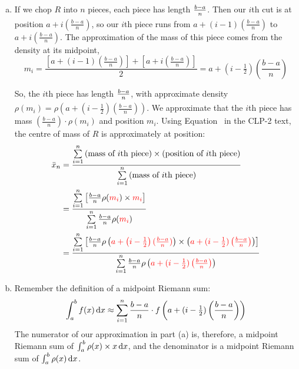 \begin{solution}
\begin{enumerate}[(a)]
\item
If we chop $R$ into $n$ pieces, each piece has length $\frac{b-a}{\vphantom{\frac12}n}$. Then our $i$th cut is at position $a+i\left(\frac{b-a}{n}\right)$, so our $i$th piece runs from $a+(i-1)\left(\frac{b-a}{n}\right)$ to $a+i\left(\frac{b-a}{n}\right)$. The approximation of the mass of this piece comes from the density at its midpoint, \[m_i=\frac{\left[a+(i-1)\left(\frac{b-a}{n}\right)\right]+\left[a+i\left(\frac{b-a}{n}\right)\right]}{2} = a+(i-\tfrac12)\left(\frac{b-a}{n}\right)\]
\begin{center}
\end{center}
So, the $i$th piece has length $\frac{b-a}{\vphantom{\frac12}n}$, with approximate density $\rho\left(m_i\right)=\rho\left(a+(i-\tfrac12)\left(\frac{b-a}{n}\right)\right)$. We approximate that the $i$th piece has mass
$\left(\frac{b-a}{n}\right)\cdot\rho\left(m_i\right)$
and position
$m_i$. Using Equation~ in the CLP-2 text, the centre of mass of $R$ is approximately at position:
\begin{align*}
\bar x_n &= \frac{\sum\limits_{i=1}^n\text{(mass of $i$th piece)}\times\text{(position of $i$th piece)}}{\sum\limits_{i=1}^n\text{(mass of $i$th piece)}}\\
&=\frac{\sum\limits_{i=1}^n\left[\frac{b-a}{n}\rho(\textcolor{red}{m_i})\times\textcolor{red}{m_i}\right]}{\sum\limits_{i=1}^n\frac{b-a}{n}\rho(\textcolor{red}{m_i})}\\
&=\frac{\sum\limits_{i=1}^n\left[\frac{b-a}{n}\rho\left(\textcolor{red}{a+\left(i-\tfrac12\right)(\tfrac{b-a}{n})}\right)\times\left(
\textcolor{red}{
a+(i-\tfrac12)\left(\tfrac{b-a}{n}\right)
}
\right)\right]}{\sum\limits_{i=1}^n\frac{b-a}{n}\rho\left(\textcolor{red}{
a+(i-\tfrac12)\left(\tfrac{b-a}{n}\right)
}
\right)}
\end{align*}

\item
Remember the definition of a midpoint Riemann sum:
\[\int_a^b f(x)\,\mathrm{d}x \approx \sum_{i=1}^n \frac{b-a}{n}\cdot f\left(a+(i-\tfrac12)\left(\frac{b-a}{n}\right)\right)\]
The numerator of our approximation in part (a) is, therefore, a midpoint Riemann sum of $\int_a^b \rho(x)\times x\,\mathrm{d}x$, and the denominator is a midpoint Riemann sum of
$\int_a^b \rho(x)\,\mathrm{d}x$.


\end{enumerate}
\end{solution}
